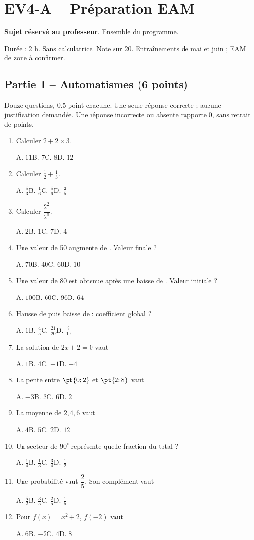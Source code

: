 \mxnewpage\section*{EV4-A -- Préparation EAM}\label{EV4-A}
\textbf{Sujet réservé au professeur}. Ensemble du programme.\par Durée : 2 h. Sans calculatrice. Note sur 20. Entraînements de mai et juin ; EAM de zone à confirmer.
\subsection*{Partie 1 -- Automatismes (6 points)}
Douze questions, \num{0,5} point chacune. Une seule réponse correcte ; aucune justification demandée. Une réponse incorrecte ou absente rapporte 0, sans retrait de points.
\begin{enumerate}
\item Calculer $2+2\times3$.\par A. $11$\quad B. $7$\quad C. $8$\quad D. $12$
\item Calculer $\frac12+\frac13$.\par A. $\frac{5}{3}$\quad B. $\frac{1}{6}$\quad C. $\frac{5}{6}$\quad D. $\frac{2}{5}$
\item Calculer $\dfrac{2^2}{2^{0}}$.\par A. $2$\quad B. $1$\quad C. $7$\quad D. $4$
\item Une valeur de 50 augmente de . Valeur finale ?\par A. $70$\quad B. $40$\quad C. $60$\quad D. $10$
\item Une valeur de 80 est obtenue après une baisse de . Valeur initiale ?\par A. $100$\quad B. $60$\quad C. $96$\quad D. $64$
\item Hausse de  puis baisse de  : coefficient global ?\par A. $1$\quad B. $\frac{4}{5}$\quad C. $\frac{21}{20}$\quad D. $\frac{9}{10}$
\item La solution de $2x+2=0$ vaut\par A. $1$\quad B. $4$\quad C. $-1$\quad D. $-4$
\item La pente entre $\pt{0;2}$ et $\pt{2;8}$ vaut\par A. $-3$\quad B. $3$\quad C. $6$\quad D. $2$
\item La moyenne de $2, 4, 6$ vaut\par A. $4$\quad B. $5$\quad C. $2$\quad D. $12$
\item Un secteur de $90^\circ$ représente quelle fraction du total ?\par A. $\frac{1}{4}$\quad B. $\frac{1}{3}$\quad C. $\frac{3}{4}$\quad D. $\frac{1}{2}$
\item Une probabilité vaut $\dfrac{2}{5}$. Son complément vaut\par A. $\frac{5}{2}$\quad B. $\frac{3}{5}$\quad C. $\frac{2}{5}$\quad D. $\frac{1}{5}$
\item Pour $f(x)=x^2+2$, $f(-2)$ vaut\par A. $6$\quad B. $-2$\quad C. $4$\quad D. $8$
\end{enumerate}
